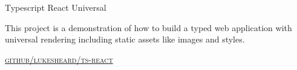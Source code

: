 {\raggedright
  {\large {
    Typescript React Universal
  } \\}


  This project is a demonstration of how to build a typed web application with universal rendering including static assets like images and styles.

  \textsc{\small\href{http://github.com/LukeSheard/typescript-universal-boilerplate-react}{github/lukesheard/ts-react}}
} \\
